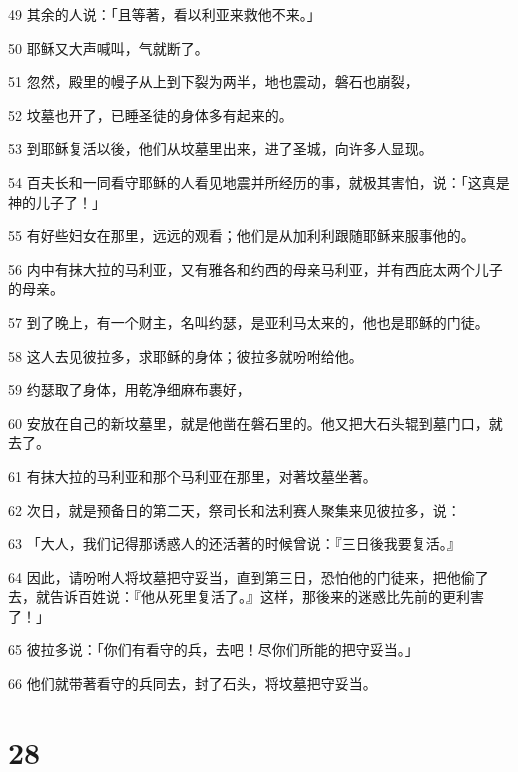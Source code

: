 \par 49 其余的人说：「且等著，看以利亚来救他不来。」
\par 50 耶稣又大声喊叫，气就断了。
\par 51 忽然，殿里的幔子从上到下裂为两半，地也震动，磐石也崩裂，
\par 52 坟墓也开了，已睡圣徒的身体多有起来的。
\par 53 到耶稣复活以後，他们从坟墓里出来，进了圣城，向许多人显现。
\par 54 百夫长和一同看守耶稣的人看见地震并所经历的事，就极其害怕，说：「这真是神的儿子了！」
\par 55 有好些妇女在那里，远远的观看；他们是从加利利跟随耶稣来服事他的。
\par 56 内中有抹大拉的马利亚，又有雅各和约西的母亲马利亚，并有西庇太两个儿子的母亲。
\par 57 到了晚上，有一个财主，名叫约瑟，是亚利马太来的，他也是耶稣的门徒。
\par 58 这人去见彼拉多，求耶稣的身体；彼拉多就吩咐给他。
\par 59 约瑟取了身体，用乾净细麻布裹好，
\par 60 安放在自己的新坟墓里，就是他凿在磐石里的。他又把大石头辊到墓门口，就去了。
\par 61 有抹大拉的马利亚和那个马利亚在那里，对著坟墓坐著。
\par 62 次日，就是预备日的第二天，祭司长和法利赛人聚集来见彼拉多，说：
\par 63 「大人，我们记得那诱惑人的还活著的时候曾说：『三日後我要复活。』
\par 64 因此，请吩咐人将坟墓把守妥当，直到第三日，恐怕他的门徒来，把他偷了去，就告诉百姓说：『他从死里复活了。』这样，那後来的迷惑比先前的更利害了！」
\par 65 彼拉多说：「你们有看守的兵，去吧！尽你们所能的把守妥当。」
\par 66 他们就带著看守的兵同去，封了石头，将坟墓把守妥当。

\chapter{28}

